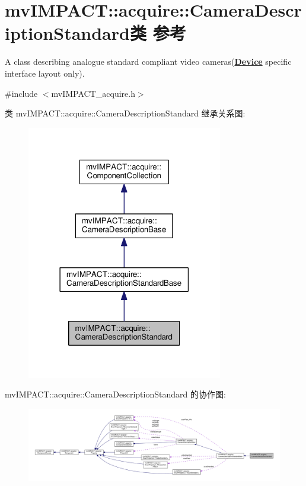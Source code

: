 \hypertarget{classmv_i_m_p_a_c_t_1_1acquire_1_1_camera_description_standard}{\section{mv\+I\+M\+P\+A\+C\+T\+:\+:acquire\+:\+:Camera\+Description\+Standard类 参考}
\label{classmv_i_m_p_a_c_t_1_1acquire_1_1_camera_description_standard}
}


A class describing analogue standard compliant video cameras({\bfseries \hyperlink{classmv_i_m_p_a_c_t_1_1acquire_1_1_device}{Device}} specific interface layout only).  




{\ttfamily \#include $<$mv\+I\+M\+P\+A\+C\+T\+\_\+acquire.\+h$>$}



类 mv\+I\+M\+P\+A\+C\+T\+:\+:acquire\+:\+:Camera\+Description\+Standard 继承关系图\+:
\nopagebreak
\begin{figure}[H]
\begin{center}
\leavevmode
\includegraphics[width=242pt]{classmv_i_m_p_a_c_t_1_1acquire_1_1_camera_description_standard__inherit__graph}
\end{center}
\end{figure}


mv\+I\+M\+P\+A\+C\+T\+:\+:acquire\+:\+:Camera\+Description\+Standard 的协作图\+:
\nopagebreak
\begin{figure}[H]
\begin{center}
\leavevmode
\includegraphics[width=350pt]{classmv_i_m_p_a_c_t_1_1acquire_1_1_camera_description_standard__coll__graph}
\end{center}
\end{figure}
